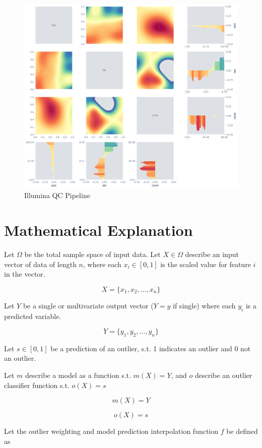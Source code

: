\documentclass[a4paperpaper,twocolumn]{article}
\begin{document}
\begin{figure}
\centering
\includegraphics[width=\columnwidth]{img/reg_rf_ocsvm_matrix.png}
\caption{Illumina QC Pipeline}
\label{fig:reg-rf-ocsvm-matrix}
\end{figure}


\section{Mathematical Explanation}

Let $\Omega$ be the total sample space of input data. Let $X \in \Omega$ describe an input vector of data of length $n$, where each $x_i \in [0, 1]$ is the scaled value for feature $i$ in the vector.

$$X = \{x_1, x_2, \ldots, x_n\}$$

Let $Y$ be a single or multivariate output vector ($Y = y$ if single) where each $y_i$ is a predicted variable.

$$Y = \{y_1, y_2, \ldots, y_n\}$$

Let $s \in [0, 1]$ be a prediction of an outlier, s.t. 1 indicates an outlier and 0 not an outlier.

Let $m$ describe a model as a function s.t. $m(X) = Y$, and $o$ describe an outlier classifier function s.t. $o(X) = s$

$$m(X) = Y$$

$$o(X) = s$$

Let the outlier weighting and model prediction interpolation function $f$ be defined as
\end{document}

